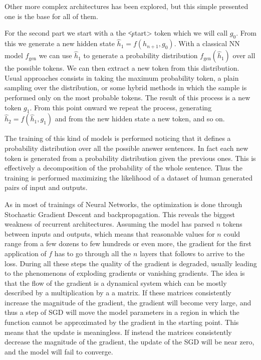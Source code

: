 \documentclass[]{marticle}
\begin{document}
Other more complex architectures has been explored, but this simple presented one is the base for
all of them.

For the second part we start with a the \c{<start>} token which we will call $g_0$. From this we
generate a new hidden state $\hat{h}_1 = f(h_{n+1}, g_0)$. With a classical NN model $f_\text{gen}$ we can
use $\hat{h}_1$ to generate a probability distribution $f_\text{gen} (\hat{h}_1)$ over all the possible
tokens. We can then extract a new token from this distribution. Usual approaches consists in taking
the maximum probability token, a plain sampling over the distribution, or some hybrid methods in
which the sample is performed only on the most probable tokens. The result of this process is a new
token $g_1$. From this point onward we repeat the process, generating $\hat{h}_2 = f(\hat{h}_1, g_1)$
and from the new hidden state a new token, and so on.

The training of this kind of models is performed noticing that it defines a probability distribution
over all the possible answer sentences. In fact each new token is generated from a probability
distribution given the previous ones. This is effectively a decomposition of the probability of the
whole sentence. Thus the training is performed maximizing the likelihood of a dataset of human
generated pairs of input and outputs.

As in most of trainings of Neural Networks, the optimization is done through Stochastic Gradient
Descent and backpropagation. This reveals the biggest weakness of recurrent architectures. Assuming
the model has parsed $n$ tokens between inputs and outputs, which means that reasonable values for
$n$ could range from a few dozens to few hundreds or even more, the gradient for the first
application of $f$ has to go through all the $n$ layers that follows to arrive to the loss. During
all these steps the quality of the gradient is degraded, usually leading to the phenomenons of
exploding gradients or vanishing gradients. The idea is that the flow of the gradient is a dynamical
system which can be mostly described by a multiplication by a a matrix. If these matrices
consistently increase the magnitude of the gradient, the gradient will become very large, and thus a
step of SGD will move the model parameters in a region in which the function cannot be approximated
by the gradient in the starting point. This means that the update is meaningless. If instead the
matrices consistently decrease the magnitude of the gradient, the update of the SGD will be near
zero, and the model will fail to converge.
\end{document}

